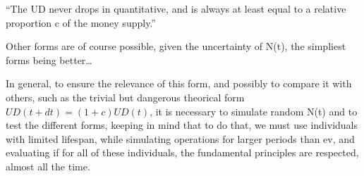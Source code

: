\documentclass[a4paper,oneside,12pt]{article}
\begin{document}
``The UD never drops in quantitative, and is always at least equal to
a relative proportion c of the money supply.''

Other forms are of course possible, given the uncertainty of N(t), the
simpliest forms being better…

In general, to ensure the relevance of this form, and possibly to
compare it with others, such as the trivial but dangerous theorical
form  $UD(t+dt)=(1+c)UD(t)$,   it is necessary to simulate random N(t)
and to test the different forms, keeping in mind that to do that, we
must use individuals with limited lifespan, while simulating
operations for larger periods than ev, and evaluating if for all of
these individuals, the fundamental principles are respected, almost
all the time.
\end{document}
